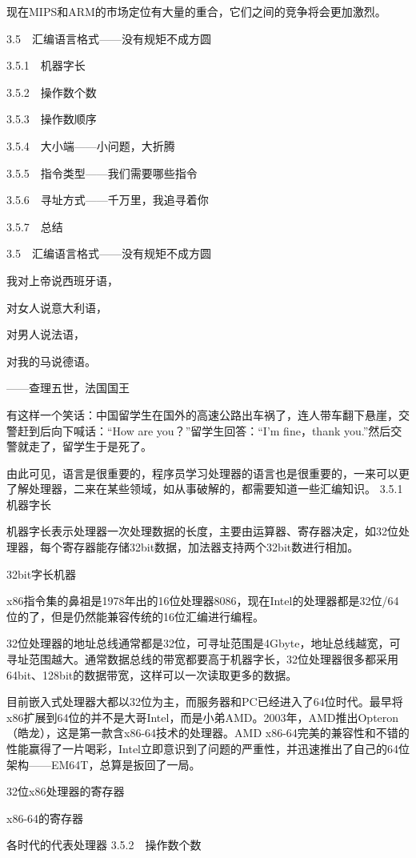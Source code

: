 \documentclass[12pt,UTF8]{ctexbook}
\begin{document}
现在MIPS和ARM的市场定位有大量的重合，它们之间的竞争将会更加激烈。


3.5　汇编语言格式——没有规矩不成方圆

3.5.1　机器字长

3.5.2　操作数个数

3.5.3　操作数顺序

3.5.4　大小端——小问题，大折腾

3.5.5　指令类型——我们需要哪些指令

3.5.6　寻址方式——千万里，我追寻着你

3.5.7　总结


3.5　汇编语言格式——没有规矩不成方圆

我对上帝说西班牙语，

对女人说意大利语，

对男人说法语，

对我的马说德语。

——查理五世，法国国王

有这样一个笑话：中国留学生在国外的高速公路出车祸了，连人带车翻下悬崖，交警赶到后向下喊话：“How are you？”留学生回答：“I'm fine，thank you.”然后交警就走了，留学生于是死了。

由此可见，语言是很重要的，程序员学习处理器的语言也是很重要的，一来可以更了解处理器，二来在某些领域，如从事破解的，都需要知道一些汇编知识。
3.5.1　机器字长

机器字长表示处理器一次处理数据的长度，主要由运算器、寄存器决定，如32位处理器，每个寄存器能存储32bit数据，加法器支持两个32bit数进行相加。

32bit字长机器

x86指令集的鼻祖是1978年出的16位处理器8086，现在Intel的处理器都是32位/64位的了，但是仍然能兼容传统的16位汇编进行编程。

32位处理器的地址总线通常都是32位，可寻址范围是4Gbyte，地址总线越宽，可寻址范围越大。通常数据总线的带宽都要高于机器字长，32位处理器很多都采用64bit、128bit的数据带宽，这样可以一次读取更多的数据。

目前嵌入式处理器大都以32位为主，而服务器和PC已经进入了64位时代。最早将x86扩展到64位的并不是大哥Intel，而是小弟AMD。2003年，AMD推出Opteron（皓龙），这是第一款含x86-64技术的处理器。AMD x86-64完美的兼容性和不错的性能赢得了一片喝彩，Intel立即意识到了问题的严重性，并迅速推出了自己的64位架构——EM64T，总算是扳回了一局。

32位x86处理器的寄存器

x86-64的寄存器

各时代的代表处理器
3.5.2　操作数个数
\end{document}
